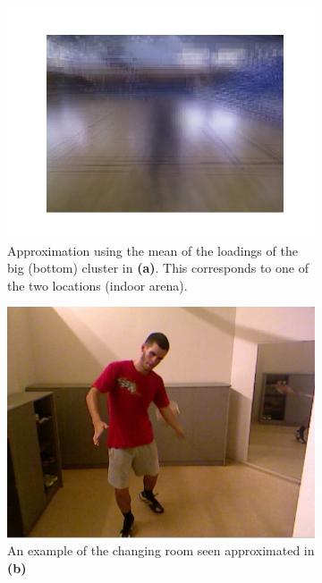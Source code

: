 \begin{figure}
\begin{subfigure}{.35\linewidth}
    \end{subfigure}
    \begin{subfigure}{.35\linewidth}
        \centering
        \captionsetup{width=.95\linewidth}
        \includegraphics[width=\linewidth]{Pics/06_results/loc2.png}
        \caption{Approximation using the mean of the loadings of the big (bottom) cluster in \textbf{(a)}. This corresponds to one of the two locations (indoor arena).}
    \end{subfigure}
    \begin{subfigure}{.35\linewidth}
        \centering
        \captionsetup{width=.95\linewidth}
        \includegraphics[width=.78\linewidth]{Pics/06_results/loc_1_real.png}
        \caption{An example of the changing room seen approximated in \textbf{(b)}}
    \end{subfigure}
    \begin{subfigure}{.35\linewidth}

\end{subfigure}
\end{figure}
